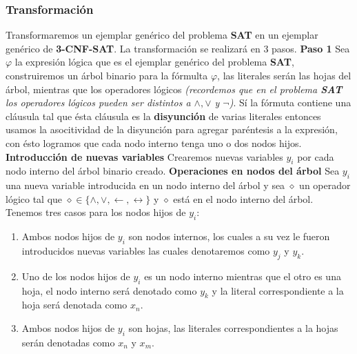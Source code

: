 \documentclass[a4paper]{article}
\begin{document}
\subsubsection{Transformación}
\noindent
Transformaremos un ejemplar genérico del problema \textbf{SAT} en un ejemplar genérico de \textbf{3-CNF-SAT}.
\newline 
La transformación se realizará en \(3\) pasos.
\newline 
\textbf{Paso 1}
\newline
Sea \(\varphi\) la expresión lógica que es el ejemplar genérico del problema \textbf{SAT}, construiremos un árbol binario 
para la fórmulta \(\varphi\), las literales serán las hojas del árbol, mientras que los operadores lógicos \textit{(recordemos que en 
el problema \textbf{SAT} los operadores lógicos pueden ser distintos a \(\land, \lor\) y \(\neg\))}.
\newline 
Sí la fórmuta contiene una cláusula tal que ésta cláusula es la \textbf{disyunción} de varias literales entonces usamos la asocitividad de 
la disyunción para agregar paréntesis a la expresión, con ésto logramos que cada nodo interno tenga uno o dos nodos hijos. 
\newline 
\textbf{Introducción de nuevas variables}
\newline 
Crearemos nuevas variables \(y_{i}\) por cada nodo interno del árbol binario creado.
\newline 
\textbf{Operaciones en nodos del árbol}
\newline 
Sea \(y_{i}\) una nueva variable introducida en un nodo interno del árbol y sea \(\diamond\) un operador lógico tal que 
\(\diamond \in \{\land, \lor, \longleftarrow, \longleftrightarrow \}\) y \(\diamond\) está en el nodo interno del árbol.
Tenemos tres casos para los nodos hijos de \(y_{i}\):
\begin{enumerate}
    \item Ambos nodos hijos de \(y_{i}\) son nodos internos, los cuales a su vez le fueron introducidos nuevas variables las cuales denotaremos como \(y_{j}\) y \(y_{k}\).
    \item Uno de los nodos hijos de \(y_{i}\) es un nodo interno mientras que el otro es una hoja, el nodo interno será denotado como \(y_{k}\) y la literal correspondiente a la hoja será denotada como \(x_{n}\).
    \item Ambos nodos hijos de \(y_{i}\) son hojas, las literales correspondientes a la hojas serán denotadas como \(x_{n}\) y \(x_{m}\).
\end{enumerate}
\end{document}
